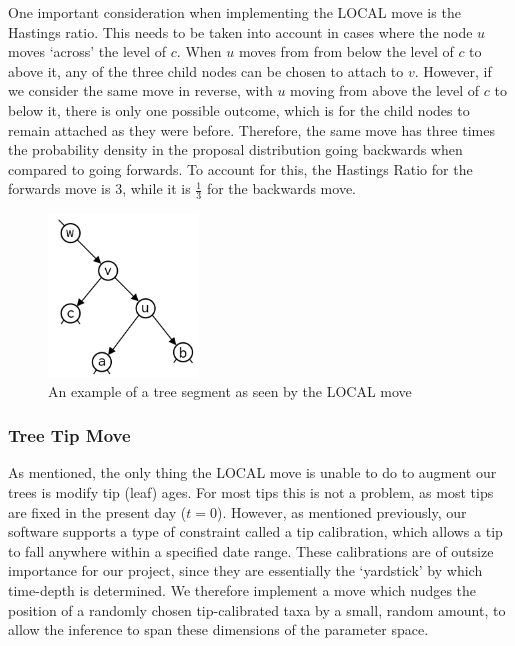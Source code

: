 \documentclass[10pt,journal,compsoc]{IEEEtran}
\begin{document}
One important consideration when implementing the LOCAL move is the Hastings ratio. This needs to be taken into account in cases where the node $u$ moves `across' the level of $c$. When $u$ moves from from below the level of $c$ to above it, any of the three child nodes can be chosen to attach to $v$. However, if we consider the same move in reverse, with $u$ moving from above the level of $c$ to below it, there is only one possible outcome, which is for the child nodes to remain attached as they were before. Therefore, the same move has three times the probability density in the proposal distribution going backwards when compared to going forwards. To account for this, the Hastings Ratio for the forwards move is $3$, while it is $\frac{1}{3}$ for the backwards move. 
\begin{figure}
\caption{An example of a tree segment as seen by the LOCAL move}\label{fig:local}
\vspace{0.2cm}
\includegraphics[width=4cm,center]{local}
\end{figure}

\subsubsection{Tree Tip Move}
As mentioned, the only thing the LOCAL move is unable to do to augment our trees is modify tip (leaf) ages. For most tips this is not a problem, as most tips are fixed in the present day ($t = 0$). However, as mentioned previously, our software supports a type of constraint called a tip calibration, which allows a tip to fall anywhere within a specified date range. These calibrations are of outsize importance for our project, since they are essentially the `yardstick' by which time-depth is determined. We therefore implement a move which nudges the position of a randomly chosen tip-calibrated taxa by a small, random amount, to allow the inference to span these dimensions of the parameter space.
\end{document}
